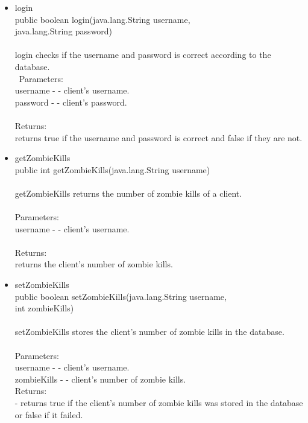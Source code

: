 \documentclass[letterpaper]{article}
\begin{document}
\begin{itemize}
\begin{itemize}
											\item	login \\
													public boolean login(java.lang.String username, \\
				            java.lang.String password) \\ \\
													login checks if the username and password is correct according to the database. \\ \
													Parameters: \\
													username - - client's username. \\
													password - - client's password. \\ \\
													Returns: \\
													returns true if the username and password is correct and false if they are not.
											\item	getZombieKills \\
													public int getZombieKills(java.lang.String username) \\ \\
													getZombieKills returns the number of zombie kills of a client. \\ \\
													Parameters: \\
													username - - client's username. \\ \\
													Returns:  \\
													returns the client's number of zombie kills.
											\item	setZombieKills \\
													public boolean setZombieKills(java.lang.String username, \\
				                     int zombieKills) \\ \\
													setZombieKills stores the client's number of zombie kills in the database. \\ \\
													Parameters: \\
													username - - client's username. \\
													zombieKills - - client's number of zombie kills. \\
													Returns: \\
													- returns true if the client's number of zombie kills was stored in the database or false if it failed.

\end{itemize}
\end{itemize}
\end{document}

